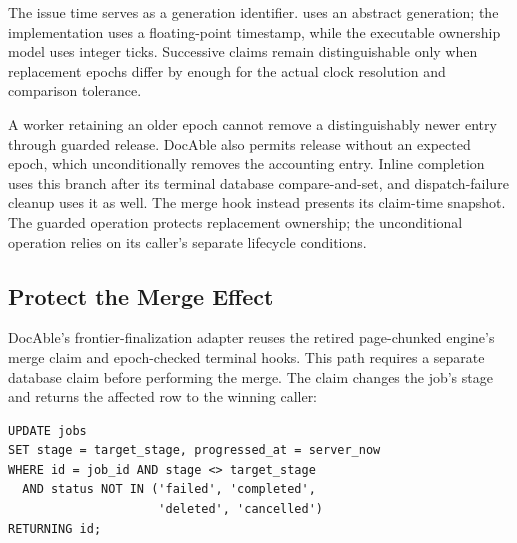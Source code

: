 
The issue time serves as a generation identifier.  uses an abstract generation; the implementation uses a floating-point timestamp, while the executable ownership model uses integer ticks. Successive claims remain distinguishable only when replacement epochs differ by enough for the actual clock resolution and comparison tolerance.



A worker retaining an older epoch cannot remove a distinguishably newer entry through guarded release. DocAble also permits release without an expected epoch, which unconditionally removes the accounting entry. Inline completion uses this branch after its terminal database compare-and-set, and dispatch-failure cleanup uses it as well. The merge hook instead presents its claim-time snapshot. The guarded operation protects replacement ownership; the unconditional operation relies on its caller's separate lifecycle conditions.

\subsection*{Protect the Merge Effect}



DocAble's frontier-finalization adapter reuses the retired page-chunked engine's merge claim and epoch-checked terminal hooks. This path requires a separate database claim before performing the merge. The claim changes the job's stage and returns the affected row to the winning caller:

\begin{verbatim}
UPDATE jobs
SET stage = target_stage, progressed_at = server_now
WHERE id = job_id AND stage <> target_stage
  AND status NOT IN ('failed', 'completed',
                     'deleted', 'cancelled')
RETURNING id;
\end{verbatim}

